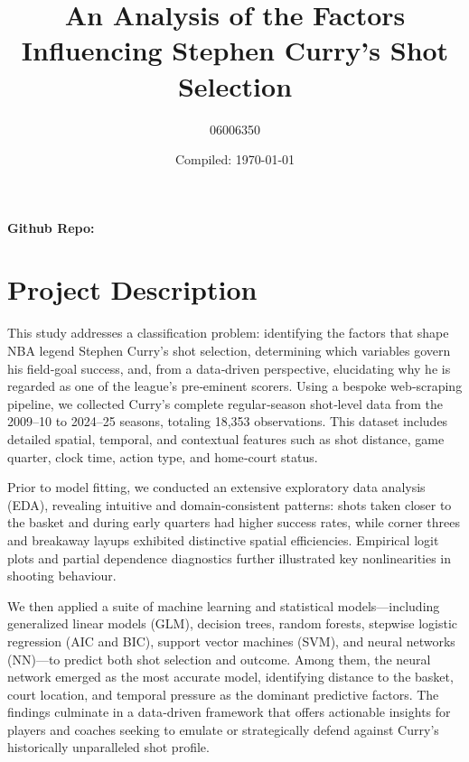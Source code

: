 \documentclass[a4paper, 12pt]{article}
\title{An Analysis of the Factors Influencing Stephen Curry's Shot Selection}
\author{06006350}
\date{Compiled: \today}
\begin{document}
\maketitle

\textbf{Github Repo:} \href{https://github.com/Xinyi10086/Data-Science-CW/releases/tag/v1.1.0}{\color{blue}{REPLACE-WITH-LINK-TO-YOUR-TAGGED-RELEASE}}

\section{Project Description}


This study addresses a classification problem: identifying the factors that shape NBA legend Stephen Curry’s shot selection, determining which variables govern his field‑goal success, and, from a data‑driven perspective, elucidating why he is regarded as one of the league’s pre‑eminent scorers. Using a bespoke web‑scraping pipeline, we collected Curry’s complete regular‑season shot‑level data from the 2009–10 to 2024–25 seasons, totaling 18,353 observations. This dataset includes detailed spatial, temporal, and contextual features such as shot distance, game quarter, clock time, action type, and home‑court status. 

Prior to model fitting, we conducted an extensive exploratory data analysis (EDA), revealing intuitive and domain-consistent patterns: shots taken closer to the basket and during early quarters had higher success rates, while corner threes and breakaway layups exhibited distinctive spatial efficiencies. Empirical logit plots and partial dependence diagnostics further illustrated key nonlinearities in shooting behaviour. 

We then applied a suite of machine learning and statistical models—including generalized linear models (GLM), decision trees, random forests, stepwise logistic regression (AIC and BIC), support vector machines (SVM), and neural networks (NN)—to predict both shot selection and outcome. Among them, the neural network emerged as the most accurate model, identifying distance to the basket, court location, and temporal pressure as the dominant predictive factors. The findings culminate in a data‑driven framework that offers actionable insights for players and coaches seeking to emulate or strategically defend against Curry’s historically unparalleled shot profile.

\pagebreak
\end{document}
